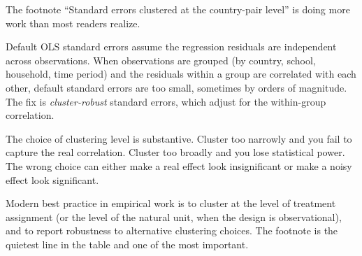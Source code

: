 \documentclass[
  letterpaper,
  11pt,
  twoside,
  openany]{scrbook}
\begin{document}
\begin{tcolorbox}[enhanced jigsaw, arc=.35mm, bottomrule=.15mm, bottomtitle=1mm, breakable, colback=white, colbacktitle=quarto-callout-note-color!10!white, colframe=quarto-callout-note-color-frame, coltitle=black, left=2mm, leftrule=.75mm, opacityback=0, opacitybacktitle=0.6, rightrule=.15mm, title=\textcolor{quarto-callout-note-color}{\faInfo}\hspace{0.5em}{Inside the math: clustering and the standard-error footnote}, titlerule=0mm, toprule=.15mm, toptitle=1mm]

The footnote ``Standard errors clustered at the country-pair level'' is
doing more work than most readers realize.

Default OLS standard errors assume the regression residuals are
independent across observations. When observations are grouped (by
country, school, household, time period) and the residuals within a
group are correlated with each other, default standard errors are too
small, sometimes by orders of magnitude. The fix is
\emph{cluster-robust} standard errors, which adjust for the within-group
correlation.

The choice of clustering level is substantive. Cluster too narrowly and
you fail to capture the real correlation. Cluster too broadly and you
lose statistical power. The wrong choice can either make a real effect
look insignificant or make a noisy effect look significant.

Modern best practice in empirical work is to cluster at the level of
treatment assignment (or the level of the natural unit, when the design
is observational), and to report robustness to alternative clustering
choices. The footnote is the quietest line in the table and one of the
most important.

\end{tcolorbox}
\end{document}
